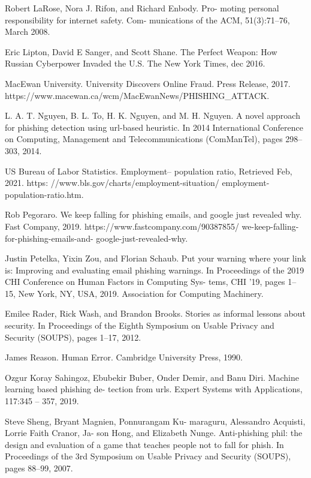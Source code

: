 \documentclass[lettersize,journal]{IEEEtran}
\begin{document}
\begin{thebibliography}{1}
  Robert LaRose, Nora J. Rifon, and Richard Enbody. Pro-
  moting personal responsibility for internet safety. Com-
  munications of the ACM, 51(3):71–76, March 2008.

  Eric Lipton, David E Sanger, and Scott Shane. The Perfect Weapon: How Russian Cyberpower Invaded the U.S. The New York Times, dec 2016.

  MacEwan University. University Discovers Online Fraud. Press Release, 2017. https://www.macewan.ca/wcm/MacEwanNews/PHISHING\_ATTACK.

  L. A. T. Nguyen, B. L. To, H. K. Nguyen, and M. H.
  Nguyen. A novel approach for phishing detection using
  url-based heuristic. In 2014 International Conference
  on Computing, Management and Telecommunications
  (ComManTel), pages 298–303, 2014.

  US Bureau of Labor Statistics. Employment–
  population ratio, Retrieved Feb, 2021. https:
  //www.bls.gov/charts/employment-situation/
  employment-population-ratio.htm.

  Rob Pegoraro. We keep falling for phishing emails,
  and google just revealed why. Fast Company,
  2019. https://www.fastcompany.com/90387855/
  we-keep-falling-for-phishing-emails-and-
  google-just-revealed-why.

  Justin Petelka, Yixin Zou, and Florian Schaub. Put your
  warning where your link is: Improving and evaluating
  email phishing warnings. In Proceedings of the 2019
  CHI Conference on Human Factors in Computing Sys-
  tems, CHI ’19, pages 1–15, New York, NY, USA, 2019.
  Association for Computing Machinery.

  Emilee Rader, Rick Wash, and Brandon Brooks. Stories
  as informal lessons about security. In Proceedings of
  the Eighth Symposium on Usable Privacy and Security
  (SOUPS), pages 1–17, 2012.

  James Reason. Human Error. Cambridge University
  Press, 1990.

  Ozgur Koray Sahingoz, Ebubekir Buber, Onder Demir,
  and Banu Diri. Machine learning based phishing de-
  tection from urls. Expert Systems with Applications,
  117:345 – 357, 2019.

  Steve Sheng, Bryant Magnien, Ponnurangam Ku-
  maraguru, Alessandro Acquisti, Lorrie Faith Cranor, Ja-
  son Hong, and Elizabeth Nunge. Anti-phishing phil: the
  design and evaluation of a game that teaches people not
  to fall for phish. In Proceedings of the 3rd Symposium
  on Usable Privacy and Security (SOUPS), pages 88–99,
  2007.


\end{thebibliography}
\end{document}
